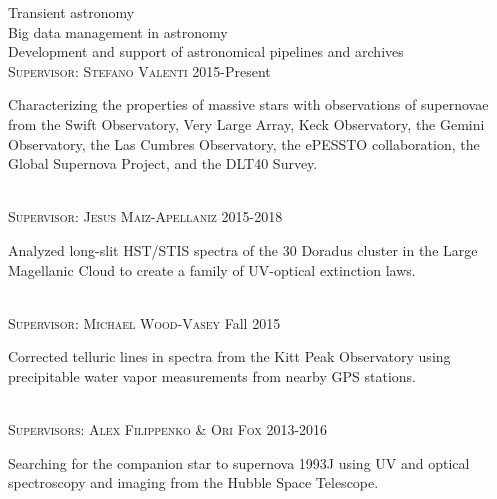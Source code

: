 \documentclass[10pt]{cv}
\begin{document}
\begin{llist}
Transient astronomy\\
Big data management in astronomy\\
Development and support of astronomical pipelines and archives\\ 
\vspace{-0.1in}   
\textsc{Supervisor: Stefano Valenti} \hfill 2015-Present\\
\begin{minipage}[l]{0.7\textwidth}\vspace{0.15cm}
Characterizing the properties of massive stars with observations of supernovae from the Swift Observatory, Very Large Array, Keck Observatory, the Gemini Observatory, the Las Cumbres Observatory, the ePESSTO collaboration, the Global Supernova Project, and the DLT40 Survey.\\
\end{minipage}
\\
\textsc{Supervisor: Jesus Maiz-Apellaniz} \hfill 2015-2018\\
\begin{minipage}[l]{0.7\textwidth}\vspace{0.15cm}
Analyzed long-slit HST/STIS spectra of the 30 Doradus cluster in 
the Large Magellanic Cloud to create a family of UV-optical extinction laws. \\
\end{minipage}
\\
\textsc{Supervisor: Michael Wood-Vasey} \hfill Fall 2015\\
\begin{minipage}[l]{0.7\textwidth}\vspace{0.15cm}
Corrected telluric lines in spectra from the Kitt Peak Observatory using
precipitable water vapor measurements from nearby GPS stations.\\
\end{minipage}
\\
\textsc{Supervisors: Alex Filippenko \& Ori Fox} \hfill 2013-2016\\
\begin{minipage}[l]{0.7\textwidth}\vspace{0.15cm}
Searching for the companion star to supernova 1993J using UV and optical 
spectroscopy and imaging from the Hubble Space Telescope.\\
\end{minipage}
\\

\end{llist}
\end{document}
